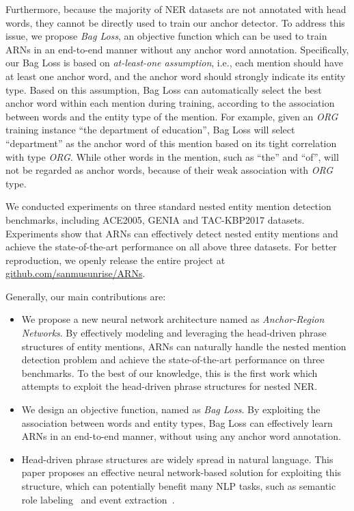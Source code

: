 \documentclass[11pt,a4paper]{article}
\begin{document}
Furthermore, because the majority of NER datasets are not annotated with head words, they cannot be directly used to train our anchor detector. To address this issue, we propose \emph{Bag Loss}, an objective function which can be used to train ARNs in an end-to-end manner without any anchor word annotation. Specifically, our Bag Loss is based on \emph{at-least-one assumption}, i.e., each mention should have at least one anchor word, and the anchor word should strongly indicate its entity type. Based on this assumption, Bag Loss can automatically select the best anchor word within each mention during training, according to the association between words and the entity type of the mention.
For example, given an \emph{ORG} training instance ``the department of education'', Bag Loss will select ``department'' as the anchor word of this mention based on its tight correlation with type \emph{ORG}. While other words in the mention, such as ``the'' and ``of'', will not be regarded as anchor words, because of their weak association with \emph{ORG} type.

We conducted experiments on three standard nested entity mention detection benchmarks, including ACE2005, GENIA and TAC-KBP2017 datasets. Experiments show that ARNs can effectively detect nested entity mentions and achieve the state-of-the-art performance on all above three datasets. For better reproduction, we openly release the entire project at \url{github.com/sanmusunrise/ARNs}.

Generally, our main contributions are:
\begin{itemize}[leftmargin=0.6cm,topsep=0.1cm]
\setlength{\itemsep}{0cm}
\setlength{\parskip}{0.1cm}
    \item We propose a new neural network architecture named as \emph{Anchor-Region Networks}. By effectively modeling and leveraging the head-driven phrase structures of entity mentions, ARNs can naturally handle the nested mention detection problem and achieve the state-of-the-art performance on three benchmarks. To the best of our knowledge, this is the first work which attempts to exploit the head-driven phrase structures for nested NER.
    \item We design an objective function, named as \emph{Bag Loss}. By exploiting the association between words and entity types, Bag Loss can effectively learn ARNs in an end-to-end manner, without using any anchor word annotation.
    \item Head-driven phrase structures are widely spread in natural language. This paper proposes an effective neural network-based solution for exploiting this structure, which can potentially benefit many NLP tasks, such as semantic role labeling~\cite{zhou2015end,he2017deep} and event extraction~\cite{chen2015event,lin2018nugget}.
\end{itemize}
\end{document}

